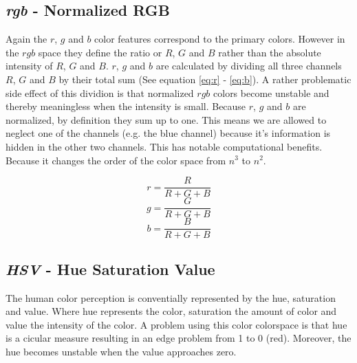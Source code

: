 \documentclass[11pt]{article}
\begin{document}
\subsection{\textit{rgb} - Normalized RGB}
Again the $r$, $g$ and $b$  color features correspond to the primary colors.
However in the $rgb$ space they define the ratio or $R$, $G$ and $B$ rather than
the absolute intensity of $R$, $G$ and $B$. $r$, $g$ and $b$ are calculated by
dividing all three channels $R$, $G$ and $B$ by their total sum (See equation
\ref{eq:r} - \ref{eq:b}). A rather problematic side effect of this dividion is
that normalized $rgb$ colors become unstable and thereby meaningless when the
intensity is small. Because $r$, $g$ and $b$ are normalized, by definition they
sum up to one. This means we are allowed to neglect one of the channels (e.g.
the blue channel) because it's information is hidden in the other two channels.
This has notable computational benefits. Because it changes the order of the
color space from $n^3$ to $n^2$.

\begin{equation}
  r = \frac{R}{R+G+B}
  \label{eq:r}
\end{equation}
\begin{equation}
  g = \frac{G}{R+G+B}
  \label{eq:g}
\end{equation}
\begin{equation}
  b = \frac{B}{R+G+B}
  \label{eq:b}
\end{equation}

\subsection{\textit{HSV} - Hue Saturation Value}
The human color perception is conventially represented by the hue, saturation
and value. Where hue represents the color, saturation the amount of color and
value the intensity of the color. A problem using this color colorspace is that
hue is a cicular measure resulting in an edge problem from 1 to 0 (red).
Moreover, the hue becomes unstable when the value approaches zero.
\end{document}
